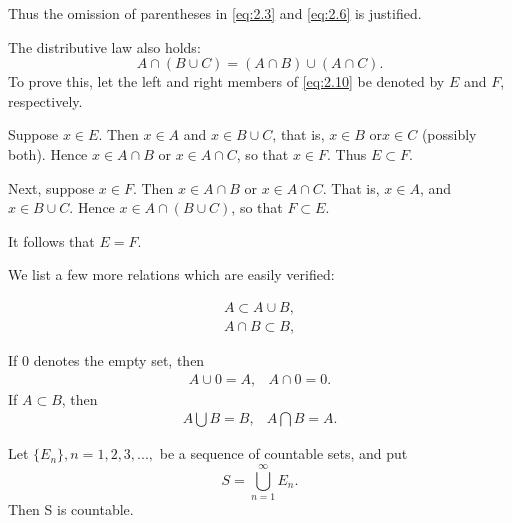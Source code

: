 Thus the omission of parentheses in \ref{eq:2.3} and \ref{eq:2.6} is justified.

The distributive law also holds:
\begin{equation}
    \label{eq:2.10}
    A \cap \left( B \cup C\right) = 
    \left(A \cap B\right) \cup \left(A \cap C\right).
\end{equation}
To prove this, let the left and right members of \ref{eq:2.10} be denoted by $E$ and $F$, respectively.

Suppose $x \in E$. Then $x \in A$ and $x \in B \cup C$, that is, $x \in B$ or$ x \in C$ (possibly both). Hence $x \in A\cap B$ or $x \in A\cap C$, so that $x \in F$. Thus $E \subset F$.

Next, suppose $x \in F$. Then $x \in A\cap B$ or $x \in A\cap C$. That is, $x \in A$, and $x \in B\cup C$. Hence $x \in A\cap \left(B \cup C\right)$, so that $F \subset E$.

It follows that $E = F$.

We list a few more relations which are easily verified:

\begin{align}
    A \subset A \cup B, \label{eq:2.11}\\
    A \cap B \subset B, \label{eq:2.12}
\end{align}

If $0$ denotes the empty set, then
\begin{equation}
    \begin{array}{cc}
        A \cup 0 = A, & A \cap 0 = 0.
    \end{array}
\end{equation}
If $A \subset B$, then
\begin{equation}
    \begin{array}{cc}
        A \bigcup B = B, & A \bigcap B = A.
    \end{array}
\end{equation}



\begin{thm}
    \label{thm:2.12}
    Let $\{E_n\}, n=1,2,3,...,$ be a sequence of countable sets, and put
    \begin{equation}
        \label{eq:2.15}
        S = \bigcup_{n=1}^{\infty} E_n.
    \end{equation}
    Then S is countable.
\end{thm}

